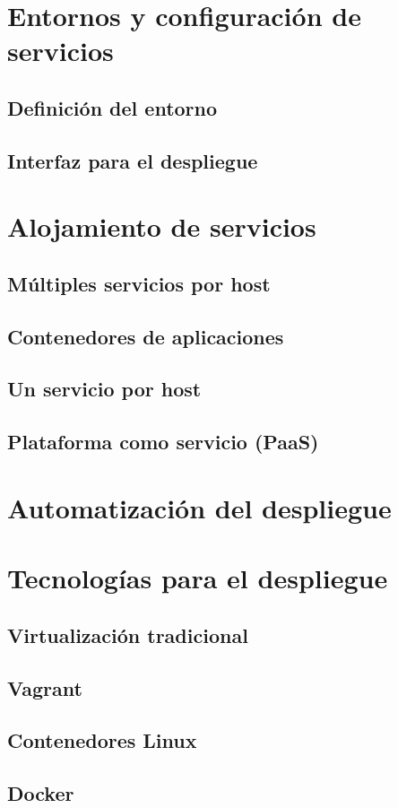 \documentclass[11pt,a4paper]{article}
\begin{document}
\section{Entornos y configuración de servicios}

\subsection{Definición del entorno}

\subsection{Interfaz para el despliegue}

\section{Alojamiento de servicios}

\subsection{Múltiples servicios por host}

\subsection{Contenedores de aplicaciones}

\subsection{Un servicio por host}

\subsection{Plataforma como servicio (PaaS)}

\section{Automatización del despliegue}

\section{Tecnologías para el despliegue}

\subsection{Virtualización tradicional}

\subsection{Vagrant}

\subsection{Contenedores Linux}

\subsection{Docker}
\end{document}
